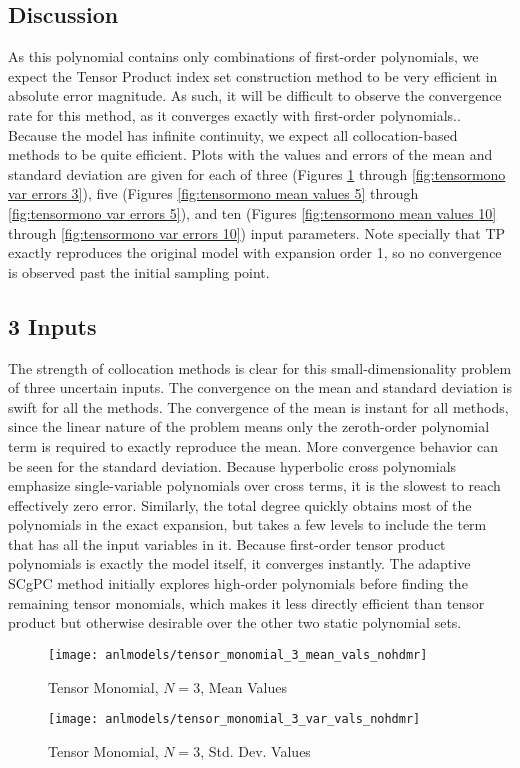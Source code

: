 \subsection{Discussion}
As this polynomial contains only combinations of
first-order polynomials, we expect the Tensor Product index set construction method to be very efficient
in absolute error magnitude.  
As such, it will be difficult to observe the convergence rate for this method, as it converges exactly with 
first-order polynomials..
Because the model has infinite continuity, we expect all collocation-based
methods to be quite efficient.  Plots with the values and errors of the mean and standard deviation are given
for each of three (Figures \ref{fig:tensormono mean values 3} through \ref{fig:tensormono var errors 3}),
five (Figures \ref{fig:tensormono mean values 5} through \ref{fig:tensormono var errors 5}), 
and ten (Figures \ref{fig:tensormono mean values 10} through \ref{fig:tensormono var errors 10})
input parameters.  Note specially that TP exactly reproduces the original model with expansion order 1, so no convergence is
observed past the initial sampling point.

\subsection{3 Inputs}
The strength of collocation methods is clear for this small-dimensionality problem of three uncertain inputs.
The convergence on the
mean and standard deviation is swift for all the methods.  The convergence of the mean is instant for all methods, since
the linear nature of the problem means only the zeroth-order polynomial term is required to exactly reproduce the mean.
More convergence behavior can be seen for the standard deviation.
Because hyperbolic cross polynomials emphasize single-variable polynomials over cross terms, it is the slowest to reach
effectively zero error.  Similarly, the total degree quickly obtains most of the polynomials in the exact expansion,
but takes a few levels to include the term that has all the input variables in it.  Because first-order tensor product
polynomials is exactly the model itself, it converges instantly.
The adaptive SCgPC method initially explores high-order polynomials before finding the remaining tensor
monomials, which makes it less directly efficient than tensor product but otherwise desirable over the other
two static polynomial sets.
\begin{figure}[H]
  \centering
  \texttt{[image: anlmodels/tensor\_monomial\_3\_mean\_vals\_nohdmr]}
  \caption{Tensor Monomial, $N=3$, Mean Values}
  \label{fig:tensormono mean values 3}
\end{figure}
\begin{figure}[H]
  \centering
  \texttt{[image: anlmodels/tensor\_monomial\_3\_var\_vals\_nohdmr]}
  \caption{Tensor Monomial, $N=3$, Std. Dev. Values}
  \label{fig:tensormono var values 3}
\end{figure}

